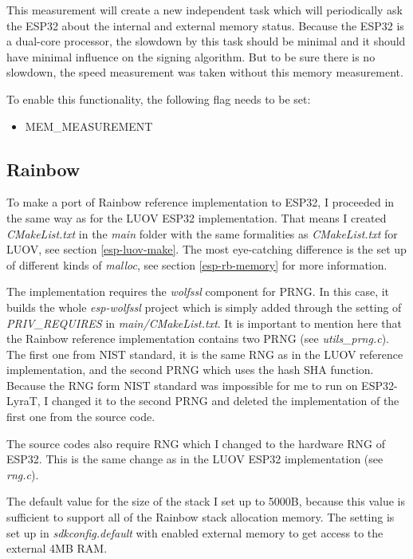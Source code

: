 \documentclass[thesis=M,english]{FITthesis}[2019/12/23]
\begin{document}
\bigskip
\noindent
This measurement will create a new independent task which will periodically ask the ESP32 about the internal and external memory status. Because the ESP32 is a dual-core processor, the slowdown by this task should be minimal and it should have minimal influence on the signing algorithm. But to be sure there is no slowdown, the speed measurement was taken without this memory measurement.

\bigskip
\noindent
To enable this functionality, the following flag needs to be set:
\begin{itemize}
\item	MEM\_MEASUREMENT
\end{itemize}

\subsection{Rainbow}
To make a port of Rainbow reference implementation to ESP32, I proceeded in the same way as for the LUOV ESP32 implementation. That means I created \textit{CMakeList.txt} in the \textit{main} folder with the same formalities as \textit{CMakeList.txt} for LUOV, see section \ref{esp-luov-make}. The most eye-catching difference is the set up of different kinds of \textit{malloc}, see section \ref{esp-rb-memory} for more information.

\bigskip
\noindent
The implementation requires the \textit{wolfssl} component for PRNG. In this case, it builds the whole \textit{esp-wolfssl} project which is simply added through the setting of \textit{PRIV\_REQUIRES} in \textit{main/CMakeList.txt}.  It is important to mention here that the Rainbow reference implementation contains two PRNG (see \textit{utils\_prng.c}). The first one from NIST standard, it is the same RNG as in the LUOV reference implementation, and the second PRNG which uses the hash SHA function. Because the RNG form NIST standard was impossible for me to run on ESP32-LyraT, I changed it to the second PRNG and deleted the implementation of the first one from the source code. 

\bigskip
\noindent
The source codes also require RNG which I changed to the hardware RNG of ESP32. This is the same change as in the LUOV ESP32 implementation (see \textit{rng.c}).

\bigskip
\noindent
The default value for the size of the stack I set up to 5000B, because this value is sufficient to support all of the Rainbow stack allocation memory. The setting is set up in \textit{sdkconfig.default} with enabled external memory to get access to the external 4MB RAM. 
\end{document}

